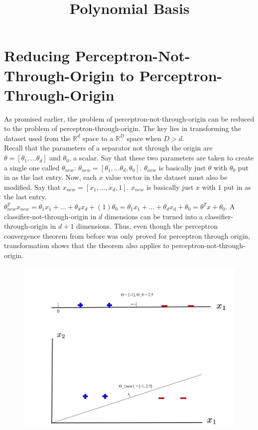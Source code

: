 \documentclass{article}
\title{Polynomial Basis}
\author{ }
\date{ }
\begin{document}
	
	\maketitle 

    \section{Reducing Perceptron-Not-Through-Origin to Perceptron-Through-Origin}
    
    As promised earlier, the problem of perceptron-not-through-origin can be reduced to the problem of perceptron-through-origin. The key lies in transforming the dataset used from the $\mathbb{R}^d$ space to a $\mathbb{R}^D$ space when $D > d$. \\
    
    Recall that the parameters of a separator not through the origin are $\theta=[\theta_1, ... \theta_d]$ and $\theta_0$, a scalar. Say that these two parameters are taken to create a single one called $\theta_{new}$: $\theta_{new} = [\theta_1, ... \theta_d, \theta_0]$. $\theta_{new}$ is basically just $\theta$ with $\theta_0$ put in as the last entry. Now, each $x$ value vector in the dataset must also be modified. Say that $x_{new} = [x_1, ...,x_d,1]$. $x_{new}$ is basically just $x$ with $1$ put in as the last entry. $\theta^T_{new}x_{new} = \theta_1x_1 + ... + \theta_dx_d+(1)\theta_0=\theta_1x_1+...+\theta_dx_d+\theta_0=\theta^Tx+\theta_0$. A classifier-not-through-origin in $d$ dimensions can be turned into a classifier-through-origin in $d+1$ dimensions. Thus, even though the perceptron convergence theorem from before was only proved for perceptron through origin, transformation shows that the theorem also applies to perceptron-not-through-origin. \\

    \begin{figure}[H]
        \centering
        \includegraphics[width=0.5\linewidth]{Perceptron-Not-Through-Origin to Perceptron-Through-Origin.png}
    \end{figure}
\end{document}
